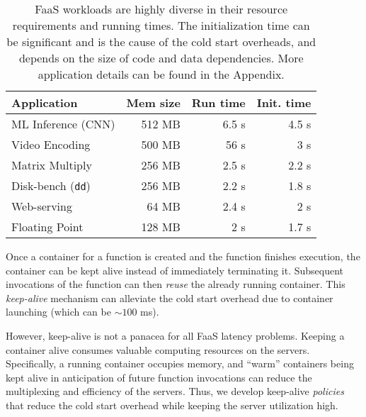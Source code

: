 \begin{table}
  \begin{tabular}{lrrr}
    \hline 
    Application & Mem size & Run time & Init. time \\
    \hline
    ML Inference (CNN) & 512 MB & 6.5 s & 4.5 s \\
    Video Encoding & 500 MB & 56 s & 3 s \\
    Matrix Multiply & 256 MB & 2.5 s & 2.2 s \\
    Disk-bench (\texttt{dd})  & 256 MB & 2.2 s & 1.8 s \\
    Web-serving & 64 MB & 2.4 s & 2 s \\
    Floating Point & 128 MB & 2 s & 1.7 s \\

    \hline
  \end{tabular}
  \caption{FaaS workloads are highly diverse in their resource requirements and running times. The initialization time can be significant and is the cause of the cold start overheads, and depends on the size of code and data dependencies. More application details can be found in the Appendix.}
  \label{tab:workloads}
\end{table}



Once a container for a function is created and the function finishes execution, the container can be kept alive instead of immediately terminating it. 
Subsequent invocations of the function can then \emph{reuse} the already running container.
This \emph{keep-alive} mechanism can alleviate the cold start overhead due to container launching (which can be $\sim 100$ ms). %



However, keep-alive is not a panacea for all FaaS latency problems. 
Keeping a container alive consumes valuable computing resources on the servers. %
Specifically, a running container occupies memory, and ``warm'' containers being kept alive in anticipation of future function invocations can reduce the multiplexing and efficiency of the servers. 
Thus, we develop keep-alive \emph{policies} that reduce the cold start overhead while keeping the server utilization high.
%

